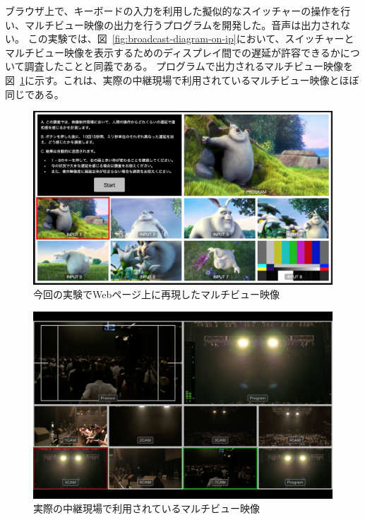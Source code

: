 ブラウザ上で、キーボードの入力を利用した擬似的なスイッチャーの操作を行い、マルチビュー映像の出力を行うプログラム\cite{mv-delay-measurement}を開発した。音声は出力されない。
この実験では、図~\ref{fig:broadcast-diagram-on-ip}において、スイッチャーとマルチビュー映像を表示するためのディスプレイ間での遅延が許容できるかについて調査したことと同義である。
プログラムで出力されるマルチビュー映像を図~\ref{fig:mv-delay-virtual}に示す。これは、実際の中継現場で利用されているマルチビュー映像とほぼ同じである。

\begin{figure}[htbp]
  \begin{center}
    \includegraphics[bb=0 0 1294 750,width=12cm]{img/mv-delay-virtual.png}
  \end{center}
  \caption{今回の実験でWebページ上に再現したマルチビュー映像}
  \label{fig:mv-delay-virtual}
\end{figure}

\begin{figure}[htbp]
  \begin{center}
    \includegraphics[bb=0 0 1680 1050,width=12cm]{img/mv-delay-actual.png}
  \end{center}
  \caption{実際の中継現場で利用されているマルチビュー映像}
  \label{fig:mv-delay-actual}
\end{figure}

